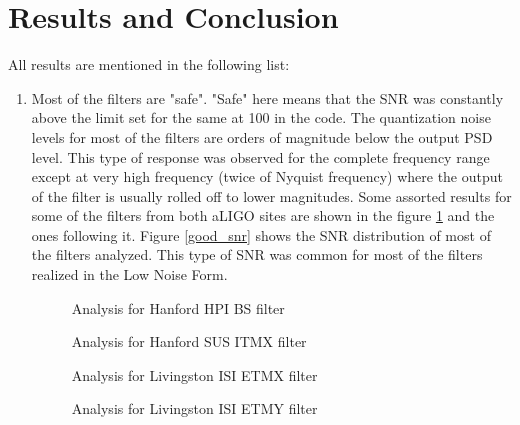 \documentclass[colorlinks=true,pdfstartview=FitV,linkcolor=blue,
            citecolor=red,urlcolor=magenta]{ligodoc}
\begin{document}
\section{Results and Conclusion} All results are mentioned in the following list:
	\begin{enumerate}
		\item Most of the filters are "safe". "Safe" here means that the SNR was constantly above the limit set for the same at 100 in the code. The quantization noise levels for most of the filters are orders of magnitude below the output PSD level. This type of response was observed for the complete frequency range except at very high frequency (twice of Nyquist frequency) where the output of the filter is usually rolled off to lower magnitudes. Some assorted results for some of the filters from both aLIGO sites are shown in the figure \ref{good} and the ones following it. Figure \ref{good_snr} shows the SNR distribution of most of the filters analyzed. This type of SNR was common for most of the filters realized in the Low Noise Form.
		\begin{figure}[H]
 
			  \centering
			  
			  \def\svgscale{0.5}
			  \tiny{
			  
			  }
			  \caption{Analysis for Hanford HPI BS filter}
			 \label{good}
		\end{figure}
		\begin{figure}[H]
 
			  \centering
			  \def\svgscale{0.5}
			  \tiny{
			  
			  }
			  \caption{Analysis for Hanford SUS ITMX filter}
		\end{figure}
		\begin{figure}[H]
 
			  \centering
			  \def\svgscale{0.5}		 
			  \tiny{ 
			  
			  }
			  \caption{Analysis for Livingston ISI ETMX filter}
		\end{figure}
		\begin{figure}[H]
 
			  \centering
			  \def\svgscale{0.5}
			  \tiny{
			  
			  }
			  \caption{Analysis for Livingston ISI ETMY filter}
		\end{figure}
		\begin{figure}[H]
 

\end{figure}
\end{enumerate}
\end{document}

